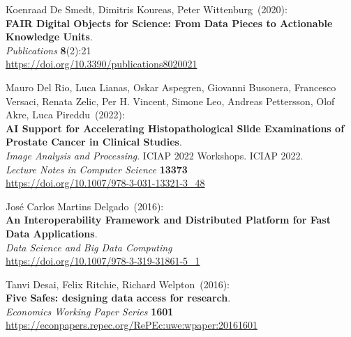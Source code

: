 \begin{thebibliography}{9}
Koenraad De Smedt, Dimitris Koureas, Peter
Wittenburg~(2020): \\
\textbf{FAIR Digital Objects for Science: From Data Pieces to Actionable
Knowledge Units}.\\
\emph{Publications} \textbf{8}(2):21\\
\url{https://doi.org/10.3390/publications8020021}


Mauro Del Rio, Luca Lianas, Oskar Aspegren, Giovanni Busonera, Francesco Versaci, Renata Zelic, Per H. Vincent, Simone Leo, Andreas Pettersson, Olof Akre, Luca Pireddu~(2022): \\
\textbf{AI Support for Accelerating Histopathological Slide Examinations of Prostate Cancer in Clinical Studies}.\\
\emph{Image Analysis and Processing}. ICIAP 2022 Workshops. ICIAP 2022. \\
\emph{Lecture Notes in Computer Science} \textbf{13373}\\
\url{https://doi.org/10.1007/978-3-031-13321-3_48}

José Carlos Martins Delgado~(2016): \\
\textbf{An Interoperability Framework and Distributed Platform for Fast Data Applications}.\\
\emph{Data Science and Big Data Computing} \\
\url{https://doi.org/10.1007/978-3-319-31861-5_1}

Tanvi Desai, Felix Ritchie, Richard Welpton~(2016): \\
\textbf{Five Safes: designing data access for research}.\\
\emph{Economics Working Paper Series} \textbf{1601}\\
\url{https://econpapers.repec.org/RePEc:uwe:wpaper:20161601}


\end{thebibliography}
